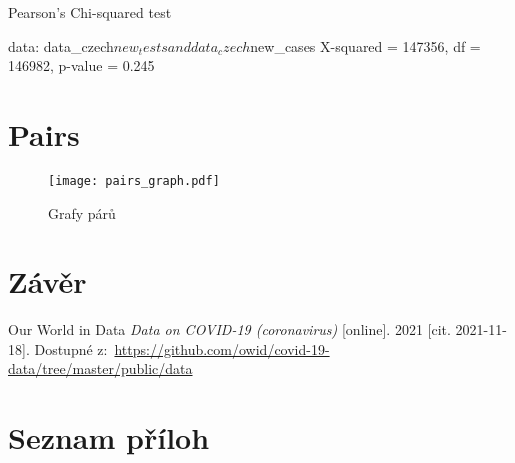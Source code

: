 \documentclass[a4paper, 12pt]{article}
\begin{document}
\begin{Schunk}
\begin{Soutput}
	Pearson's Chi-squared test

data:  data_czech$new_tests and data_czech$new_cases
X-squared = 147356, df = 146982, p-value = 0.245
\end{Soutput}
\end{Schunk}

\section{Pairs}

\begin{figure}[H]
\centering
\texttt{[image: pairs\_graph.pdf]}
\caption{Grafy párů}
\end{figure}

\clearpage


\clearpage {} {}
\section*{Závěr}


\clearpage {} {}

\begin{thebibliography}{99}	%


Our World in Data
\textit{Data on COVID-19 (coronavirus)} [online]. 2021 [cit. 2021-11-18]. Dostupné z:~\url{https://github.com/owid/covid-19-data/tree/master/public/data}

\end{thebibliography}


\clearpage {} {}
\section*{Seznam příloh}
\end{document}
